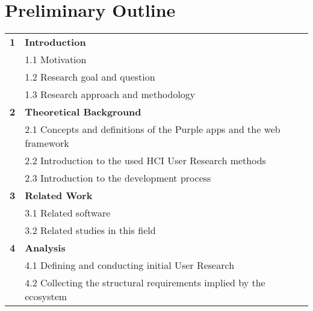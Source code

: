 \section{Preliminary Outline}
\label{sec:outline}

\small
\colorbox{usethiscolorhere}{
\centering
\begin{tabularx}{\textwidth}{@{} r Y @{}}
	\textbf{1}
	& \textbf{Introduction}\vspace{2mm}\\
	& 1.1 Motivation \vspace{2mm}\\
	& 1.2 Research goal and question\vspace{2mm}\\
	& 1.3 Research approach and methodology\vspace{2mm}\\
	\textbf{2}
	& \textbf{Theoretical Background}\vspace{2mm}\\
	& 2.1 Concepts and definitions of the Purple apps and the web framework \vspace{2mm}\\
	& 2.2 Introduction to the used HCI User Research methods \vspace{2mm}\\
	& 2.3 Introduction to the development process \vspace{2mm}\\
	\textbf{3}
	& \textbf{Related Work}\vspace{2mm}\\
    & 3.1 Related software\vspace{2mm}\\
    & 3.2 Related studies in this field\vspace{2mm}\\
	\textbf{4}
	& \textbf{Analysis}\vspace{2mm}\\
    & 4.1 Defining and conducting initial User Research\vspace{2mm}\\
    & 4.2 Collecting the structural requirements implied by the ecosystem\vspace{2mm}\\

\end{tabularx}}

